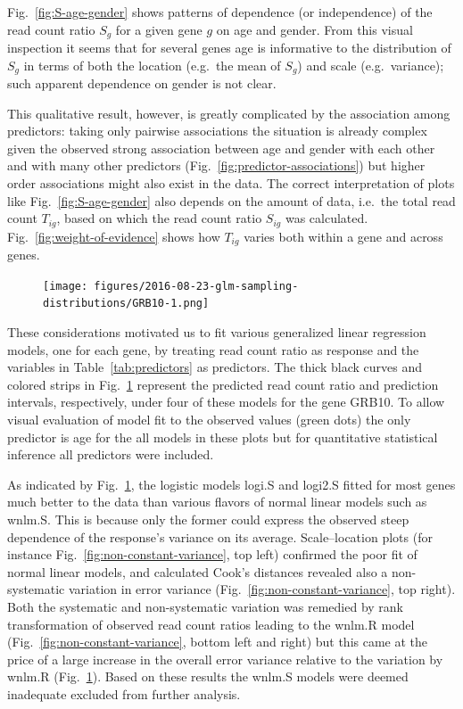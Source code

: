 \documentclass[letterpaper]{article}
\begin{document}
Fig.~\ref{fig:S-age-gender} shows patterns of dependence (or independence) of
the read count ratio \(S_g\) for a given gene \(g\) on age and gender.  From
this visual inspection it seems that for several genes age is informative to
the distribution of \(S_g\) in terms of both the location (e.g.~the mean of
\(S_g\)) and scale (e.g.~variance); such apparent dependence on gender is not
clear.

This qualitative result, however, is greatly complicated by the association
among predictors: taking only pairwise associations the situation is already
complex given the observed strong association between age and gender with each
other and with many other predictors (Fig.~\ref{fig:predictor-associations})
but higher order associations might also exist in the data.
The correct interpretation of plots like Fig.~\ref{fig:S-age-gender} also depends on
the amount of data, i.e.~the total read count \(T_{ig}\), based on which the
read count ratio \(S_{ig}\) was calculated.  Fig.~\ref{fig:weight-of-evidence}
shows how \(T_{ig}\) varies both within a gene and across genes.

\begin{figure}
\begin{center}
\texttt{[image: figures/2016-08-23-glm-sampling-distributions/GRB10-1.png]}
\end{center}
\caption{}
\label{fig:predicted-curves}
\end{figure}

These considerations motivated us to fit various generalized linear regression
models, one for each gene, by treating read count ratio as response and the
variables in Table~\ref{tab:predictors} as predictors. The thick black curves
and colored strips in Fig.~\ref{fig:predicted-curves} represent the predicted
read count ratio and prediction intervals, respectively, under four of these
models for the gene GRB10.  To allow visual evaluation of model fit to the
observed values (green dots) the only predictor is age for the all models in
these plots but for quantitative statistical inference all predictors were
included.

As indicated by Fig.~\ref{fig:predicted-curves}, the logistic models logi.S
and logi2.S fitted for most genes much better to the data than various flavors
of normal linear models such as wnlm.S.  This is because only the former could
express the observed steep dependence of the response's variance on its
average.  Scale--location plots (for instance
Fig.~\ref{fig:non-constant-variance}, top left) confirmed the poor fit of
normal linear models, and calculated Cook's distances revealed also a
non-systematic variation in error variance
(Fig.~\ref{fig:non-constant-variance}, top right).  Both the systematic and
non-systematic variation was remedied by rank transformation of observed read
count ratios leading to the wnlm.R model
(Fig.~\ref{fig:non-constant-variance}, bottom left and right) but this came at
the price of a large increase in the overall error variance relative to the
variation by wnlm.R (Fig.~\ref{fig:predicted-curves}).  Based on these results
the wnlm.S models were deemed inadequate excluded from further
analysis.
\end{document}
